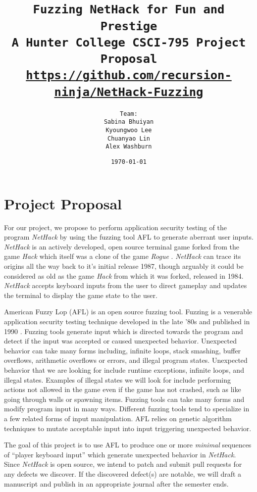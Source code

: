 \documentclass[12pt]{diazessay}
\title{\texttt{\huge{Fuzzing NetHack for Fun and Prestige} \\\vspace{-0.65cm} {\large A Hunter College CSCI-795 Project Proposal}\\\normalsize\url{https://github.com/recursion-ninja/NetHack-Fuzzing}}} %
\author{\texttt{{\Huge Team:}\\\vspace*{-0.5em} 
		Sabina Bhuiyan \\\vspace*{-0.5em} 
		Kyoungwoo Lee \\\vspace*{-0.5em}
		Chuanyao Lin \\\vspace*{-0.25em}
		Alex Washburn}} %
\date{\texttt{\today}} %
\begin{document}
\maketitle %

\vspace{-1cm}
\section*{Project Proposal}

For our project, we propose to perform application security testing of the program \emph{NetHack} \cite{NetHack_page} \cite{NetHack01} by using the fuzzing tool AFL \cite{AFL_page} to generate aberrant user inputs. 
\emph{NetHack} is an actively developed, open source terminal game forked from the game \emph{Hack} \cite{Hack} which itself was a clone of the game \emph{Rogue} \cite{Rogue} \cite{Rogue01}. 
\emph{NetHack} can trace its origins all the way back to it's initial release 1987, though arguably it could be considered as old as the game \emph{Hack} from which it was forked, released in 1984. 
\emph{NetHack} accepts keyboard inputs from the user to direct gameplay and updates the terminal to display the game state to the user.

American Fuzzy Lop (AFL) \cite{AFL_page} is an open source fuzzing tool.
Fuzzing is a venerable application security testing technique developed in the late '80s \cite{Barton1988} and published in 1990 \cite{Miller1990}.
Fuzzing tools generate input which is directed towards the program and detect if the input was accepted or caused unexpected behavior.
Unexpected behavior can take many forms including, infinite loops, stack smashing, buffer overflows, arithmetic overflows or errors, and illegal program states.
Unexpected behavior that we are looking for include runtime exceptions, infinite loops, and illegal states.
Examples of illegal states we will look for include performing actions not allowed in the game even if the game has not crashed, such as like going through walls or spawning items.
Fuzzing tools can take many forms \cite{ModelBasedFuzzing}\cite{GrammarBasedFuzzing}\cite{ProtocolBasedFuzzing} and modify program input in many ways.
Different fuzzing tools tend to specialize in a few related forms of input\cite{InputDiversity} manipulation.
AFL relies on genetic algorithm techniques\cite{InputMutationAlgorithm} to mutate acceptable input into input triggering unexpected behavior.

The goal of this project is to use AFL to produce one or more \emph{minimal} sequences of ``player keyboard input''\cite{PlayerKeyboardInput} which generate unexpected behavior in \emph{NetHack}.
Since \emph{NetHack} is open source, we intend to patch and submit pull requests for any defects we discover.
If the discovered defect(s) are notable, we will draft a manuscript and publish in an appropriate journal after the semester ends.
\end{document}
